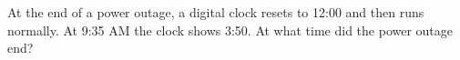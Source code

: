 At the end of a power outage, a digital clock resets to 12:00 and then runs normally. At 9:35 AM the clock shows 3:50. At what time did the power outage end?
